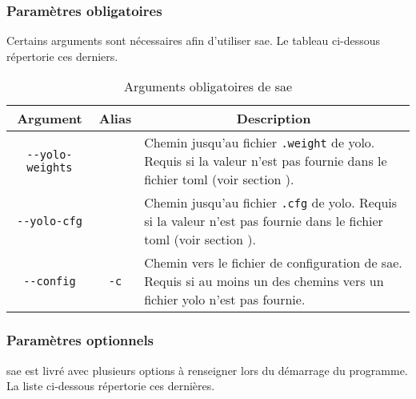 \subsubsection{Paramètres obligatoires}
\label{sec:executionArg_clearWay}

Certains arguments sont nécessaires afin d'utiliser \gls{sae}. Le tableau ci-dessous répertorie ces derniers.

\begin{table}[H]
    \centering
    \begin{tabularx}{\linewidth}{|c|c|X|}
        \hline
        \rowcolor{tableColorDark}
        Argument                  & Alias       & \multicolumn{1}{c|}{\cellcolor{tableColorDark}Description}                                                                                                                    \\ \hline
        \texttt{-{}-yolo-weights} &             & Chemin jusqu'au fichier \texttt{.weight} de \gls{yolo}. Requis si la valeur n'est pas fournie dans le fichier \gls{toml} (voir section \nameref{sec:executionTOML_clearWay}). \\ \hline
        \texttt{-{}-yolo-cfg}     &             & Chemin jusqu’au fichier \texttt{.cfg} de \gls{yolo}. Requis si la valeur n'est pas fournie dans le fichier \gls{toml} (voir section \nameref{sec:executionTOML_clearWay}).    \\ \hline
        \texttt{-{}-config}       & \texttt{-c} & Chemin vers le fichier de configuration de \gls{sae}. Requis si au moins un des chemins vers un fichier \gls{yolo} n'est pas fournie.                                         \\ \hline
    \end{tabularx}
    \caption{Arguments obligatoires de \gls{sae}}
\end{table}

\subsubsection{Paramètres optionnels}
\label{sec:executionOption_clearWay}
\gls{sae} est livré avec plusieurs options à renseigner lors du démarrage du programme. La liste ci-dessous répertorie ces dernières.

